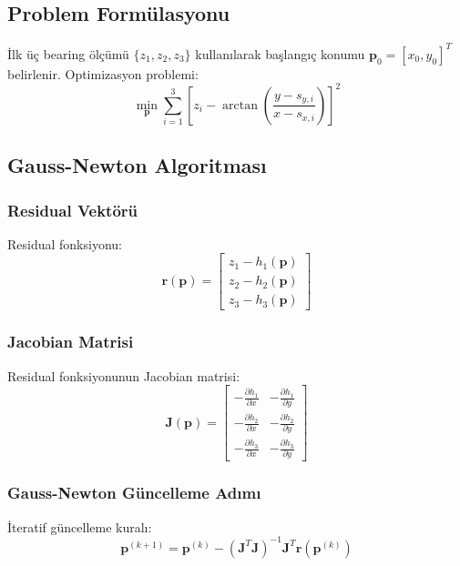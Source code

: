 \documentclass[12pt,a4paper]{article}
\begin{document}
\subsection{Problem Formülasyonu}
İlk üç bearing ölçümü $\{z_1, z_2, z_3\}$ kullanılarak başlangıç konumu $\mathbf{p}_0 = [x_0, y_0]^T$ belirlenir. Optimizasyon problemi:
\begin{equation}
\min_{\mathbf{p}} \sum_{i=1}^{3} \left[ z_i - \arctan\left(\frac{y - s_{y,i}}{x - s_{x,i}}\right) \right]^2
\label{eq:nls_objective}
\end{equation}

\subsection{Gauss-Newton Algoritması}

\subsubsection{Residual Vektörü}
Residual fonksiyonu:
\begin{equation}
\mathbf{r}(\mathbf{p}) = \begin{bmatrix}
z_1 - h_1(\mathbf{p}) \\
z_2 - h_2(\mathbf{p}) \\
z_3 - h_3(\mathbf{p})
\end{bmatrix}
\end{equation}

\subsubsection{Jacobian Matrisi}
Residual fonksiyonunun Jacobian matrisi:
\begin{equation}
\mathbf{J}(\mathbf{p}) = \begin{bmatrix}
-\frac{\partial h_1}{\partial x} & -\frac{\partial h_1}{\partial y} \\
-\frac{\partial h_2}{\partial x} & -\frac{\partial h_2}{\partial y} \\
-\frac{\partial h_3}{\partial x} & -\frac{\partial h_3}{\partial y}
\end{bmatrix}
\end{equation}

\subsubsection{Gauss-Newton Güncelleme Adımı}
İteratif güncelleme kuralı:
\begin{equation}
\mathbf{p}^{(k+1)} = \mathbf{p}^{(k)} - \left(\mathbf{J}^T\mathbf{J}\right)^{-1} \mathbf{J}^T \mathbf{r}(\mathbf{p}^{(k)})
\end{equation}
\end{document}

